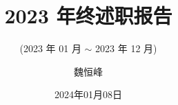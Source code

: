 \documentclass[]{beamer}
\title[2023 年终述职报告]{2023 年终述职报告}
\subtitle{(2023 年 01 月 $\sim$ 2023 年 12 月)}
\author[魏恒峰]{魏恒峰}
\institute{hfwei@nju.edu.cn}
\date{2024年01月08日}
\begin{document}
\maketitle





\thankyou{}
\end{document}
